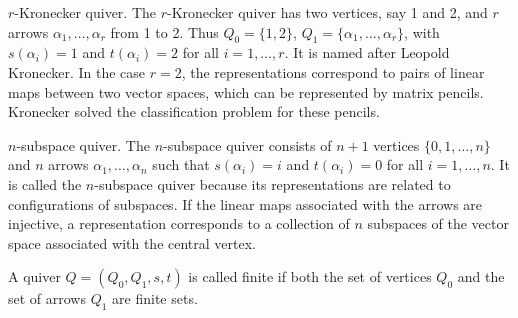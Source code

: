 \documentclass[11pt, a4paper]{report}
\begin{document}
\begin{example}
    $r$-Kronecker quiver.
    The $r$-Kronecker quiver has two vertices, say 1 and 2, and $r$ arrows $\alpha_1, \dots, \alpha_r$ from 1 to 2. Thus $Q_0 = \{1, 2\}$, $Q_1 = \{\alpha_1, \dots, \alpha_r\}$, with $s(\alpha_i) = 1$ and $t(\alpha_i) = 2$ for all $i=1, \dots, r$.
    It is named after Leopold Kronecker. In the case $r=2$, the representations correspond to pairs of linear maps between two vector spaces, which can be represented by matrix pencils. Kronecker solved the classification problem for these pencils.
    \begin{center}
    \end{center}
\end{example}

\begin{example}
    $n$-subspace quiver.
    The $n$-subspace quiver consists of $n+1$ vertices $\{0, 1, \dots, n\}$ and $n$ arrows $\alpha_1, \dots, \alpha_n$ such that $s(\alpha_i) = i$ and $t(\alpha_i) = 0$ for all $i=1, \dots, n$.
    It is called the $n$-subspace quiver because its representations are related to configurations of subspaces. If the linear maps associated with the arrows are injective, a representation corresponds to a collection of $n$ subspaces of the vector space associated with the central vertex.
    \begin{center}
    \end{center}
\end{example}

\begin{definition}
    A quiver $Q=(Q_0, Q_1, s, t)$ is called finite if both the set of vertices $Q_0$ and the set of arrows $Q_1$ are finite sets.
\end{definition}
\end{document}

